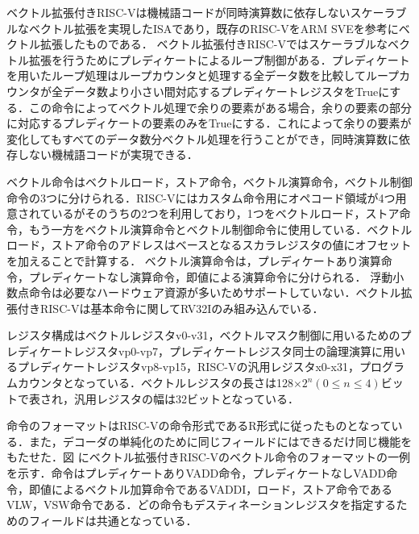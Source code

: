 
ベクトル拡張付きRISC-Vは機械語コードが同時演算数に依存しないスケーラブルなベクトル拡張を実現したISAであり，既存のRISC-VをARM SVEを参考にベクトル拡張したものである．
ベクトル拡張付きRISC-Vではスケーラブルなベクトル拡張を行うためにプレディケートによるループ制御がある．プレディケートを用いたループ処理はループカウンタと処理する全データ数を比較してループカウンタが全データ数より小さい間対応するプレディケートレジスタをTrueにする．この命令によってベクトル処理で余りの要素がある場合，余りの要素の部分に対応するプレディケートの要素のみをTrueにする．これによって余りの要素が変化してもすべてのデータ数分ベクトル処理を行うことができ，同時演算数に依存しない機械語コードが実現できる．

ベクトル命令はベクトルロード，ストア命令，ベクトル演算命令，ベクトル制御命令の3つに分けられる．RISC-Vにはカスタム命令用にオペコード領域が4つ用意されているがそのうちの2つを利用しており，1つをベクトルロード，ストア命令，もう一方をベクトル演算命令とベクトル制御命令に使用している．ベクトルロード，ストア命令のアドレスはベースとなるスカラレジスタの値にオフセットを加えることで計算する．
ベクトル演算命令は，プレディケートあり演算命令，プレディケートなし演算命令，即値による演算命令に分けられる．
浮動小数点命令は必要なハードウェア資源が多いためサポートしていない．ベクトル拡張付きRISC-Vは基本命令に関してRV32Iのみ組み込んでいる．

レジスタ構成はベクトルレジスタv0-v31，ベクトルマスク制御に用いるためのプレディケートレジスタvp0-vp7，プレディケートレジスタ同士の論理演算に用いるプレディケートレジスタvp8-vp15，RISC-Vの汎用レジスタx0-x31，プログラムカウンタとなっている．ベクトルレジスタの長さは128$\times 2^n(0\leq n\leq 4)$ビットで表され，汎用レジスタの幅は32ビットとなっている．

命令のフォーマットはRISC-Vの命令形式であるR形式に従ったものとなっている．また，デコーダの単純化のために同じフィールドにはできるだけ同じ機能をもたせた．図%
にベクトル拡張付きRISC-Vのベクトル命令のフォーマットの一例を示す．命令はプレディケートありVADD命令，プレディケートなしVADD命令，即値によるベクトル加算命令であるVADDI，ロード，ストア命令であるVLW，VSW命令である．どの命令もデスティネーションレジスタを指定するためのフィールドは共通となっている．